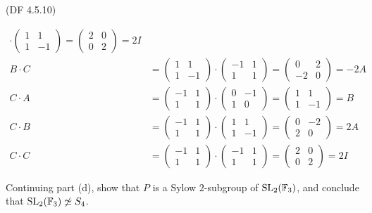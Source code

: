 \begin{problem}{(\textsf{DF 4.5.10})}
\begin{enumalph}
\begin{Answer}
\begin{align*}
          \cdot \begin{pmatrix} 1 & 1 \\ 1 & -1 \end{pmatrix}
          = \begin{pmatrix} 2 & 0 \\ 0 & 2 \end{pmatrix} = 2I \\
          B \cdot C &= \begin{pmatrix} 1 & 1 \\ 1 & -1 \end{pmatrix}
          \cdot \begin{pmatrix} -1 & 1 \\ 1 & 1 \end{pmatrix}
          = \begin{pmatrix} 0 & 2 \\ -2 & 0 \end{pmatrix} = -2A \\
          C \cdot A &= \begin{pmatrix} -1 & 1 \\ 1 & 1 \end{pmatrix}
          \cdot \begin{pmatrix} 0 & -1 \\ 1 & 0 \end{pmatrix}
          = \begin{pmatrix} 1 & 1 \\ 1 & -1 \end{pmatrix} = B \\
          C \cdot B &= \begin{pmatrix} -1 & 1 \\ 1 & 1 \end{pmatrix}
          \cdot \begin{pmatrix} 1 & 1 \\ 1 & -1 \end{pmatrix}
          = \begin{pmatrix} 0 & -2 \\ 2 & 0 \end{pmatrix} = 2A \\
          C \cdot C &= \begin{pmatrix} -1 & 1 \\ 1 & 1 \end{pmatrix}
          \cdot \begin{pmatrix} -1 & 1 \\ 1 & 1 \end{pmatrix}
          = \begin{pmatrix} 2 & 0 \\ 0 & 2 \end{pmatrix} = 2I
        \end{align*}
      \end{Answer}
    \item Continuing part (d), show that $P$ is a Sylow $2$-subgroup of $\operatorname{SL}_2(\mathbb{F}_3)$,
      and conclude that $\operatorname{SL}_2(\mathbb{F}_3) \not\simeq S_4$.  
  \end{enumalph}
\end{problem}
